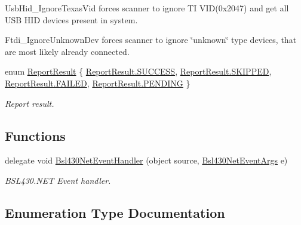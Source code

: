 \begin{DoxyCompactItemize}
\begin{DoxyCompactList}
\textquotesingle{}Usb\+Hid\+\_\+\+Ignore\+Texas\+Vid\textquotesingle{} forces scanner to ignore TI V\+I\+D(0x2047) and get all U\+SB H\+ID devices present in system. 

\textquotesingle{}Ftdi\+\_\+\+Ignore\+Unknown\+Dev\textquotesingle{} forces scanner to ignore \char`\"{}unknown\char`\"{} type devices, that are most likely already connected. \end{DoxyCompactList}\item 
enum \mbox{\hyperlink{namespace_b_s_l430___n_e_t_a5329555917cbeec8fdb5a3fe35126138}{Report\+Result}} \{ \mbox{\hyperlink{namespace_b_s_l430___n_e_t_a5329555917cbeec8fdb5a3fe35126138ad0749aaba8b833466dfcbb0428e4f89c}{Report\+Result.\+S\+U\+C\+C\+E\+SS}}, 
\mbox{\hyperlink{namespace_b_s_l430___n_e_t_a5329555917cbeec8fdb5a3fe35126138a203ec08f57cb105eeb2b121ba6503b52}{Report\+Result.\+S\+K\+I\+P\+P\+ED}}, 
\mbox{\hyperlink{namespace_b_s_l430___n_e_t_a5329555917cbeec8fdb5a3fe35126138ab9e14d9b2886bcff408b85aefa780419}{Report\+Result.\+F\+A\+I\+L\+ED}}, 
\mbox{\hyperlink{namespace_b_s_l430___n_e_t_a5329555917cbeec8fdb5a3fe35126138ac69f06e1a9b016d133907b4e5f5864d2}{Report\+Result.\+P\+E\+N\+D\+I\+NG}}
 \}
\begin{DoxyCompactList}\small\item\em Report result. \end{DoxyCompactList}\end{DoxyCompactItemize}
\subsection*{Functions}
\begin{DoxyCompactItemize}
\item 
delegate void \mbox{\hyperlink{namespace_b_s_l430___n_e_t_a98dbd2acd09405042ee92547353c9f81}{Bsl430\+Net\+Event\+Handler}} (object source, \mbox{\hyperlink{class_b_s_l430___n_e_t_1_1_bsl430_net_event_args}{Bsl430\+Net\+Event\+Args}} e)
\begin{DoxyCompactList}\small\item\em B\+S\+L430.\+N\+ET Event handler. \end{DoxyCompactList}\end{DoxyCompactItemize}


\subsection{Enumeration Type Documentation}
\mbox{\label{namespace_b_s_l430___n_e_t_a8d30c263598635a481840944d38aeb70}} 
